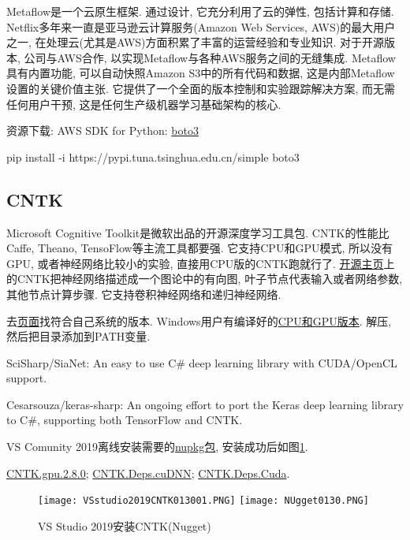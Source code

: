 Metaflow是一个云原生框架. 通过设计, 它充分利用了云的弹性, 包括计算和存储.
Netflix多年来一直是亚马逊云计算服务(Amazon Web Services, AWS)的最大用户之一, 在处理云(尤其是AWS)方面积累了丰富的运营经验和专业知识. 对于开源版本, 公司与AWS合作, 以实现Metaflow与各种AWS服务之间的无缝集成.
Metaflow具有内置功能, 可以自动快照Amazon S3中的所有代码和数据, 这是内部Metaflow设置的关键价值主张. 它提供了一个全面的版本控制和实验跟踪解决方案, 而无需任何用户干预, 这是任何生产级机器学习基础架构的核心.

\begin{remark}
资源下载: AWS SDK for Python: \href{https://github.com/boto/boto3}{boto3}

pip install -i https://pypi.tuna.tsinghua.edu.cn/simple boto3
\end{remark}
\subsection{CNTK}
Microsoft Cognitive Toolkit是微软出品的开源深度学习工具包.
CNTK的性能比Caffe, Theano, TensoFlow等主流工具都要强. 它支持CPU和GPU模式, 所以没有GPU, 或者神经网络比较小的实验, 直接用CPU版的CNTK跑就行了. \href{https://github.com/Microsoft/CNTK}{开源主页}上的CNTK把神经网络描述成一个图论中的有向图, 叶子节点代表输入或者网络参数, 其他节点计算步骤. 它支持卷积神经网络和递归神经网络. 

去\href{https://github.com/Microsoft/CNTK/wiki/CNTK-Binary-Download-and-Configuration}{页面}找符合自己系统的版本.
Windows用户有编译好的\href{https://cntk.ai/nightly-windows.html}{CPU和GPU版本}. 解压, 然后把目录添加到PATH变量.

SciSharp/SiaNet: An easy to use C\# deep learning library with CUDA/OpenCL support.

Cesarsouza/keras-sharp: An ongoing effort to port the Keras deep learning library to C\#, supporting both TensorFlow and CNTK.

VS Comunity 2019离线安装需要的\href{https://www.nuget.org/packages?q=CNTK.GPU}{nupkg包}, 安装成功后如图\ref{VSstudio2019CNTK013001}.

\href{https://globalcdn.nuget.org/packages/cntk.gpu.2.8.0-rc0.dev20200126.nupkg}{CNTK.gpu.2.8.0};
\href{https://www.nuget.org/api/v2/package/CNTK.Deps.cuDNN/2.8.0-rc0.dev20200127}{CNTK.Deps.cuDNN};
\href{https://www.nuget.org/packages/CNTK.Deps.Cuda/}{CNTK.Deps.Cuda}.

\begin{figure}[H]
\centering
\texttt{[image: VSstudio2019CNTK013001.PNG]}
\texttt{[image: NUgget0130.PNG]}
\caption{VS Studio 2019安装CNTK(Nugget)}
\label{VSstudio2019CNTK013001}
\end{figure}

